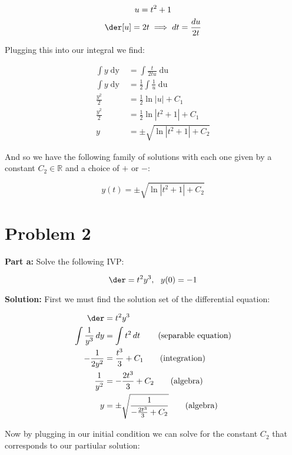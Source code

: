 \documentclass{article}
\begin{document}
\begin{gather*}
    u=t^2+1\\
    \der[u]=2t\implies dt=\frac{du}{2t}
\end{gather*}

Plugging this into our integral we find:

\begin{align*}
    \int y\mathop{dy}&=\int \frac{t}{2tu}\mathop{du}\tag{$u$-substitution}\\
    \int y\mathop{dy}&=\frac{1}{2}\int\frac{1}{u}\mathop{du}\tag{algebra}\\
    \frac{y^2}{2}&=\frac{1}{2}\ln{|u|}+C_1\tag{integration}\\
    \frac{y^2}{2}&=\frac{1}{2}\ln{|t^2+1|}+C_1\tag{$u$-substitution}\\
    y&=\pm\sqrt{\ln{|t^2+1|}+C_2}\tag{algebra}
\end{align*}

And so we have the following family of solutions with each one given by a constant $C_2\in\mathbb R$ and a choice of $+$ or $-$:

\begin{equation*}
    y(t)=\pm\sqrt{\ln{|t^2+1|}+C_2}
\end{equation*}

\section*{Problem 2}
\noindent\textbf{Part a:} Solve the following IVP:

\begin{equation*}
    \der=t^2y^3,\,\,\,\, y(0)=-1
\end{equation*}
\smallskip

\noindent\textbf{Solution:} First we must find the solution set of the differential equation:

\begin{align*}
    \der&=t^2y^3\\
    \int \frac{1}{y^3}\mathop{dy}&=\int t^2\mathop{dt}\tag{separable equation}\\
    -\frac{1}{2y^2}&=\frac{t^3}{3}+C_1\tag{integration}\\
    \frac{1}{y^2}&=-\frac{2t^3}{3}+C_2\tag{algebra}\\
    y&=\pm\sqrt{\frac{1}{-\frac{2t^3}{3}+C_2}}\tag{algebra}
\end{align*}

Now by plugging in our initial condition we can solve for the constant $C_2$ that corresponds to our partiular solution:
\end{document}
